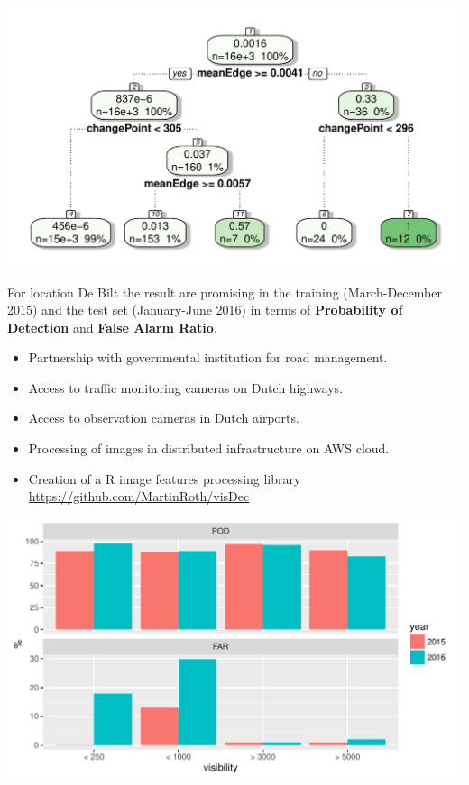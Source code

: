 \documentclass{article}
\begin{document}
\begin{minipage}[b]{\columnwidth}
	\begin{center}
	\includegraphics[width=0.9\columnwidth]{ClassificationTree-1}
	\label{figTree}
	\end{center}
\end{minipage}
For location De Bilt the result are promising in the training (March-December 2015) and the test set (January-June 2016) in terms of \textbf{Probability of Detection} and \textbf{False Alarm Ratio}.
\begin{tcolorbox}[colback=red!5!white,colframe=red!75!black,title=Overall Project Results]
\begin{itemize}
\item{Partnership with governmental institution for road management.}
\item{Access to traffic monitoring cameras on Dutch highways.}
\item{Access to observation cameras in Dutch airports.}
\item{Processing of images in distributed infrastructure on AWS cloud.}
\item{Creation of a R image features processing library \url{https://github.com/MartinRoth/visDec}}
\end{itemize}
\end{tcolorbox}
\begin{minipage}[b]{\columnwidth}
	\begin{center}
	\includegraphics[width=0.9\columnwidth]{PODandFAR3-1}
	\label{figTree}
	\end{center}
\end{minipage}
\end{document}
